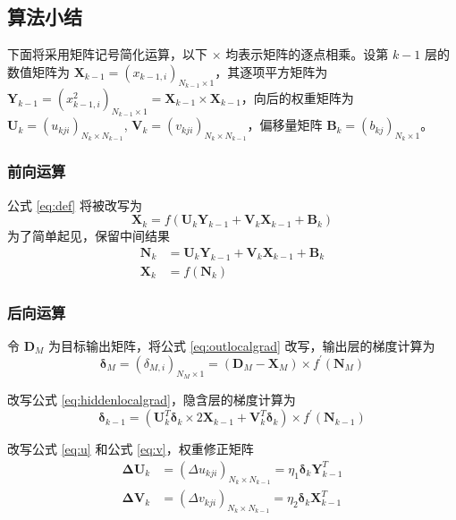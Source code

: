     \subsection{算法小结}

    下面将采用矩阵记号简化运算，以下 $\times$ 均表示矩阵的逐点相乘。设第 $k-1$ 层的数值矩阵为 $\mathbf{X}_{k-1}=(x_{k-1,i})_{N_{k-1}\times 1}$，其逐项平方矩阵为 $\mathbf{Y}_{k-1}=(x_{k-1,i}^2)_{N_{k-1}\times 1}=\mathbf{X}_{k-1}\times\mathbf{X}_{k-1}$，向后的权重矩阵为 $\mathbf{U}_{k}=(u_{kji})_{N_{k}\times N_{k-1}}$, $\mathbf{V}_{k}=(v_{kji})_{N_{k}\times N_{k-1}}$，偏移量矩阵 $\mathbf{B}_{k}=(b_{kj})_{N_{k}\times 1}$。

    \subsubsection{前向运算}

    公式 \eqref{eq:def} 将被改写为
    \begin{equation*}
        \mathbf{X}_{k} = f\left(\mathbf{U}_{k}\mathbf{Y}_{k-1} + \mathbf{V}_{k}\mathbf{X}_{k-1} + \mathbf{B}_{k}\right)
    \end{equation*}
    为了简单起见，保留中间结果 
    \begin{align}
        \mathbf{N}_{k}&=\mathbf{U}_{k}\mathbf{Y}_{k-1} + \mathbf{V}_{k}\mathbf{X}_{k-1} + \mathbf{B}_{k}\\
        \mathbf{X}_{k}&=f(\mathbf{N}_k)
    \end{align}

    \subsubsection{后向运算}

    令 $\mathbf{D}_M$ 为目标输出矩阵，将公式 \eqref{eq:outlocalgrad} 改写，输出层的梯度计算为
    \begin{equation}
        \boldsymbol{\delta}_{M} = (\delta_{M,i})_{N_M\times 1} = (\mathbf{D}_M - \mathbf{X}_M)\times f^\prime(\mathbf{N}_M)
    \end{equation}

    改写公式 \eqref{eq:hiddenlocalgrad}，隐含层的梯度计算为
    \begin{equation}
        \boldsymbol{\delta}_{k-1} = \left(\mathbf{U}_{k}^T\boldsymbol{\delta}_{k}\times 2\mathbf{X}_{k-1}+\mathbf{V}_{k}^T\boldsymbol{\delta}_{k}\right)\times f^\prime(\mathbf{N}_{k-1})
    \end{equation}

    改写公式 \eqref{eq:u} 和公式 \eqref{eq:v}，权重修正矩阵
    \begin{align*}
        \mathbf{\Delta U}_{k} &= (\Delta u_{kji})_{N_{k}\times N_{k-1}} = \eta_1 \boldsymbol{\delta}_k\mathbf{Y}_{k-1}^T \\
        \mathbf{\Delta V}_{k} &= (\Delta v_{kji})_{N_{k}\times N_{k-1}} = \eta_2 \boldsymbol{\delta}_k\mathbf{X}_{k-1}^T 
    \end{align*}

